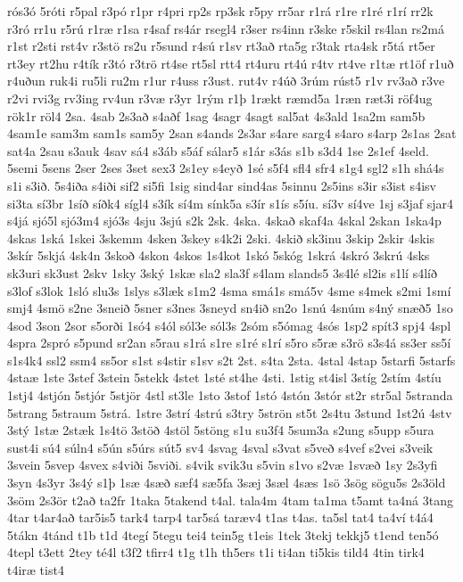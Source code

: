 {rós3ó
5róti
r5pal
r3pó
r1pr
r4pri
rp2s
rp3sk
r5py
rr5ar
r1rá
r1re
r1ré
r1rí
rr2k
r3ró
rr1u
r5rú
r1ræ
r1sa
r4saf
rs4ár
rsegl4
r3ser
rs4inn
r3ske
r5skil
rs4lan
rs2má
r1st
r2sti
rst4v
r3stö
rs2u
r5sund
r4sú
r1sv
rt3að
rta5g
r3tak
rta4sk
r5tá
rt5er
rt3ey
rt2hu
r4tík
r3tó
r3trö
rt4se
rt5sl
rtt4
rt4uru
rt4ú
r4tv
rt4ve
r1tæ
rt1öf
r1uð
r4uðun
ruk4i
ru5li
ru2m
r1ur
r4uss
r3ust.
rut4v
r4úð
3rúm
rúst5
r1v
rv3að
r3ve
r2vi
rvi3g
rv3ing
rv4un
r3væ
r3yr
1rým
r1þ
1rækt
ræmd5a
1ræn
ræt3i
röf4ug
rök1r
röl4
2sa.
4sab
2s3að
s4aðf
1sag
4sagr
4sagt
sal5at
4s3ald
1sa2m
sam5b
4sam1e
sam3m
sam1s
sam5y
2san
s4ands
2s3ar
s4are
sarg4
s4aro
s4arp
2s1as
2sat
sat4a
2sau
s3auk
4sav
sá4
s3áb
s5áf
sálar5
s1ár
s3ás
s1b
s3d4
1se
2s1ef
4seld.
5semi
5sens
2ser
2ses
3set
sex3
2s1ey
s4eyð
1sé
s5f4
sfl4
sfr4
s1g4
sgl2
s1h
shá4s
s1i
s3ið.
5s4iða
s4iði
sif2
si5fi
1sig
sind4ar
sind4as
5sinnu
2s5ins
s3ir
s3ist
s4isv
si3ta
sí3br
1síð
síðk4
sígl4
s3ík
sí4m
sínk5a
s3ír
s1ís
s5íu.
sí3v
sí4ve
1sj
s3jaf
sjar4
s4já
sjó5l
sjó3m4
sjó3s
4sju
3sjú
s2k
2sk.
4ska.
4skað
skaf4a
4skal
2skan
1ska4p
4skas
1ská
1skei
3skemm
4sken
3skey
s4k2i
2ski.
4skið
sk3inu
3skip
2skir
4skis
3skír
5skjá
4sk4n
3skoð
4skon
4skos
1s4kot
1skó
5skóg
1skrá
4skró
3skrú
4sks
sk3uri
sk3ust
2skv
1sky
3ský
1skæ
sla2
sla3f
s4lam
slands5
3s4lé
sl2is
s1lí
s4líð
s3lof
s3lok
1sló
slu3s
1slys
s3læk
s1m2
4sma
smá1s
smá5v
4sme
s4mek
s2mi
1smí
smj4
4smö
s2ne
3sneið
5sner
s3nes
3sneyd
sn4ið
sn2o
1snú
4snúm
s4ný
snæð5
1so
4sod
3son
2sor
s5orði
1só4
s4ól
sól3e
sól3s
2sóm
s5ómag
4sós
1sp2
spít3
spj4
4spl
4spra
2spró
s5pund
sr2an
s5rau
s1rá
s1re
s1ré
s1rí
s5ro
s5ræ
s3rö
s3s4á
ss3er
ss5í
s1s4k4
ssl2
ssm4
ss5or
s1st
s4stir
s1sv
s2t
2st.
s4ta
2sta.
4stal
4stap
5starfi
5starfs
4staæ
1ste
3stef
3stein
5stekk
4stet
1sté
st4he
4sti.
1stig
st4isl
3stíg
2stím
4stíu
1stj4
4stjón
5stjór
5stjör
4stl
st3le
1sto
3stof
1stó
4stón
3stór
st2r
str5al
5stranda
5strang
5straum
5strá.
1stre
3strí
4strú
s3try
5strön
st5t
2s4tu
3stund
1st2ú
4stv
3stý
1stæ
2stæk
1s4tö
3stöð
4stöl
5stöng
s1u
su3f4
5sum3a
s2ung
s5upp
s5ura
sust4i
sú4
súln4
s5ún
s5úrs
sút5
sv4
4svag
4sval
s3vat
s5veð
s4vef
s2vei
s3veik
3svein
5svep
4svex
s4viði
5sviði.
s4vik
svik3u
s5vin
s1vo
s2væ
1svæð
1sy
2s3yfi
3syn
4s3yr
3s4ý
s1þ
1sæ
4sæð
sæf4
sæ5fa
3sæj
3sæl
4sæs
1sö
3sög
sögu5s
2s3öld
3söm
2s3ör
t2að
ta2fr
1taka
5takend
t4al.
tala4m
4tam
ta1ma
t5amt
ta4ná
3tang
4tar
t4ar4að
tar5is5
tark4
tarp4
tar5sá
taræv4
t1as
t4as.
ta5sl
tat4
ta4ví
t4á4
5tákn
4tánd
t1b
t1d
4tegí
5tegu
tei4
tein5g
t1eis
1tek
3tekj
tekkj5
t1end
ten5ó
4tepl
t3ett
2tey
té4l
t3f2
tfirr4
t1g
t1h
th5ers
t1i
ti4an
ti5kis
tild4
4tin
tirk4
t4iræ
tist4
}

